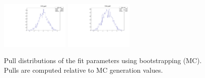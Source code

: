\begin{figure}[tb]
\begin{center}
	\includegraphics[width=0.3\textwidth]{figs/MCPulls/DG_pull.pdf}
	\includegraphics[width=0.3\textwidth]{figs/MCPulls/Dm_pull.pdf}
   \end{center}
   \caption{
       Pull distributions of the fit parameters using bootstrapping (MC).
       Pulls are computed relative to MC generation values.
   }
   \label{fig:Pulls_MC}
\end{figure}

